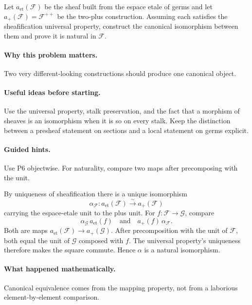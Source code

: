 \begin{problem}
Let $a_{\mathrm{et}}(\mathcal F)$ be the sheaf built from the espace etale of germs and let $a_+(\mathcal F)=\mathcal F^{++}$ be the two-plus construction. Assuming each satisfies the sheafification universal property, construct the canonical isomorphism between them and prove it is natural in $\mathcal F$.
\end{problem}

\paragraph{Why this problem matters.}
Two very different-looking constructions should produce one canonical object.

\paragraph{Useful ideas before starting.}
Use the universal property, stalk preservation, and the fact that a morphism of sheaves is an isomorphism when it is so on every stalk.  Keep the distinction between a presheaf statement on sections and a local statement on germs explicit.

\paragraph{Guided hints.}
Use P6 objectwise. For naturality, compare two maps after precomposing with the unit.

\ifdefined\FullProblemDossiers
\begin{solution}
By uniqueness of sheafification there is a unique isomorphism
\[
\alpha_{\mathcal F}:a_{\mathrm{et}}(\mathcal F)\xrightarrow{\sim}a_+(\mathcal F)
\]
carrying the espace-etale unit to the plus unit. For $f:\mathcal F\to\mathcal G$, compare
\[
\alpha_{\mathcal G}\,a_{\mathrm{et}}(f)
\quad\text{and}\quad
a_+(f)\,\alpha_{\mathcal F}.
\]
Both are maps $a_{\mathrm{et}}(\mathcal F)\to a_+(\mathcal G)$. After precomposition with the unit of $\mathcal F$, both equal the unit of $\mathcal G$ composed with $f$. The universal property's uniqueness therefore makes the square commute. Hence $\alpha$ is a natural isomorphism.
\end{solution}

\paragraph{What happened mathematically.}
Canonical equivalence comes from the mapping property, not from a laborious element-by-element comparison.

